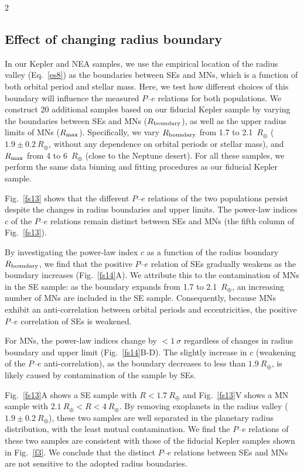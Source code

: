 \documentclass[10pt]{article}
\begin{document}
\begin{multicols}{2}
\subsection*{\hypertarget{s5}{Effect of changing radius boundary}}
\noindent In our Kepler and NEA samples, we use the empirical location of the radius valley (Eq.~\ref{es8}) as the boundaries between SEs and MNs, which is a function of both orbital period and stellar mass.
Here, we test how different choices of this boundary will influence the measured $P$--$e$ relations for both populations.
We construct 20 additional samples based on our fiducial Kepler sample by varying the boundaries between SEs and MNs ($R_{\rm boundary}$), as well as the upper radius limits of MNs ($R_{\rm max}$).
Specifically, we vary $R_{\rm boundary}$ from 1.7 to 2.1~$R_\oplus$ ($1.9\pm0.2~R_\oplus$, without any dependence on orbital periods or stellar mass), and $R_{\rm max}$ from 4 to 6~$R_\oplus$ (close to the Neptune desert\cite{2011ApJ...727L..44S,2016A&A...589A..75M,2024A&A...689A.250C}).
For all these samples, we perform the same data binning and fitting procedures as our fiducial Kepler sample.

Fig.~\ref{fs13} shows that the different $P$--$e$ relations of the two populations persist despite the changes in radius boundaries and upper limits.
The power-law indices $c$ of the $P$--$e$ relations remain distinct between SEs and MNs (the fifth column of Fig.~\ref{fs13}).

By investigating the power-law index $c$ as a function of the radius boundary $R_{\rm boundary}$, we find that the positive $P$--$e$ relation of SEs gradually weakens as the boundary increases (Fig.~\ref{fs14}A).
We attribute this to the contamination of MNs in the SE sample: as the boundary expands from 1.7 to 2.1~$R_\oplus$, an increasing number of MNs are included in the SE sample.
Consequently, because MNs exhibit an anti-correlation between orbital periods and eccentricities, the positive $P$--$e$ correlation of SEs is weakened.

For MNs, the power-law indices change by $<1~\sigma$ regardless of changes in radius boundary and upper limit (Fig.~\ref{fs14}B-D).
The slightly increase in $c$ (weakening of the $P$--$e$ anti-correlation), as the boundary decreases to less than $1.9~R_\oplus$, is likely caused by contamination of the sample by SEs.

Fig.~\ref{fs13}A shows a SE sample with $R<1.7~R_\oplus$ and Fig.~\ref{fs13}V shows a MN sample with $2.1~R_\oplus<R<4~R_\oplus$.
By removing exoplanets in the radius valley ($1.9\pm0.2~R_\oplus$), these two samples are well separated in the planetary radius distribution, with the least mutual contamination.
We find the $P$--$e$ relations of these two samples are consistent with those of the fiducial Kepler samples shown in Fig.~\ref{f3}.
We conclude that the distinct $P$--$e$ relations between SEs and MNs are not sensitive to the adopted radius boundaries.
\end{multicols}
\end{document}

